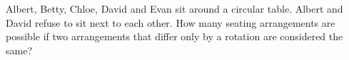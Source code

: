 Albert, Betty, Chloe, David and Evan sit around a circular table. Albert and David refuse to sit next to each other. How many seating arrangements are possible if two arrangements that differ only by a rotation are considered the same?
